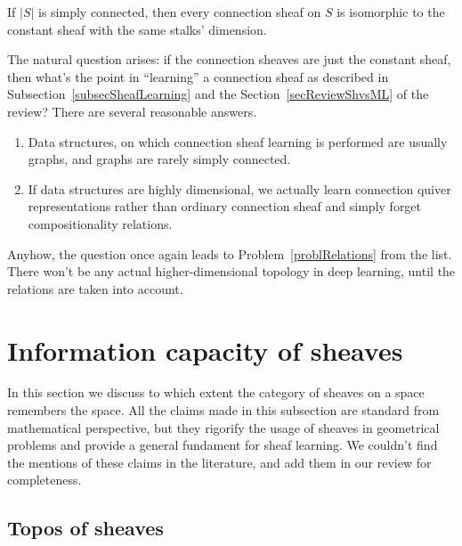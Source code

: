 \begin{cor}\label{corConnSheafOnSimplyConnected}
If $|S|$ is simply connected, then every connection sheaf on $S$ is isomorphic to the constant sheaf with the same stalks' dimension.
\end{cor}

\begin{rem}\label{remWhyLearnConnectionSheaf}
The natural question arises: if the connection sheaves are just the constant sheaf, then what's the point in ``learning'' a connection sheaf as described in Subsection~\ref{subsecSheafLearning} and the Section~\ref{secReviewShvsML} of the review? There are several reasonable answers.
\begin{enumerate}
  \item Data structures, on which connection sheaf learning is performed are usually graphs, and graphs are rarely simply connected.
  \item If data structures are highly dimensional, we actually learn connection quiver representations rather than ordinary connection sheaf and simply forget compositionality relations.
\end{enumerate}
Anyhow, the question once again leads to Problem~\ref{problRelations} from the list. There won't be any actual higher-dimensional topology in deep learning, until the relations are taken into account.
\end{rem}


\section{Information capacity of sheaves}\label{secMathSpaceRestoredFromShvs}

In this section we discuss to which extent the category of sheaves on a space remembers the space. All the claims made in this subsection are standard from mathematical perspective, but they rigorify the usage of sheaves in geometrical problems and provide a general fundament for sheaf learning. We couldn't find the mentions of these claims in the literature, and add them in our review for completeness.

\subsection{Topos of sheaves}

